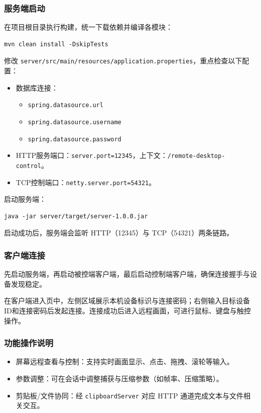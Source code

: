 \documentclass[UTF8,fontset=none]{ctexart}
\begin{document}
\subsubsection{服务端启动}
在项目根目录执行构建，统一下载依赖并编译各模块：
\begin{verbatim}
mvn clean install -DskipTests
\end{verbatim}
修改 \texttt{server/src/main/resources/application.properties}，重点检查以下配置：
\begin{itemize}
	\item 数据库连接：
	\begin{itemize}
		\item \texttt{spring.datasource.url}
		\item \texttt{spring.datasource.username}
		\item \texttt{spring.datasource.password}
	\end{itemize}
	\item HTTP服务端口：\texttt{server.port=12345}，上下文：\texttt{/remote-desktop-control}。
	\item TCP控制端口：\texttt{netty.server.port=54321}。
\end{itemize}
启动服务端：
\begin{verbatim}
java -jar server/target/server-1.0.0.jar
\end{verbatim}
启动成功后，服务端会监听 HTTP（12345）与 TCP（54321）两条链路。

\subsubsection{客户端连接}
先启动服务端，再启动被控端客户端，最后启动控制端客户端，确保连接握手与设备发现稳定。

在客户端进入页中，左侧区域展示本机设备标识与连接密码；右侧输入目标设备ID和连接密码后发起连接。连接成功后进入远程画面，可进行鼠标、键盘与触控操作。

\subsubsection{功能操作说明}
\begin{itemize}
	\item 屏幕远程查看与控制：支持实时画面显示、点击、拖拽、滚轮等输入。
	\item 参数调整：可在会话中调整捕获与压缩参数（如帧率、压缩策略）。
	\item 剪贴板/文件协同：经 \texttt{clipboardServer} 对应 HTTP 通道完成文本与文件相关交互。
\end{itemize}
\end{document}
